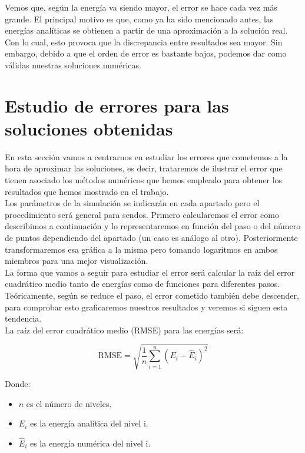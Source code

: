 \documentclass[12pt]{article}
\begin{document}
Vemos que, según la energía va siendo mayor, el error se hace 
cada vez más grande. El principal motivo es que, como ya ha sido 
mencionado antes, las energías analíticas se obtienen a partir 
de una aproximación a la solución real. Con lo cual, esto provoca
que la discrepancia entre resultados sea mayor. Sin embargo,
debido a que el orden de error es bastante bajos, podemos dar
como válidas nuestras soluciones numéricas.
\section{Estudio de errores para las soluciones obtenidas} \label{sec:errores}

En esta sección vamos a centrarnos en estudiar los errores que cometemos a la hora de aproximar las soluciones, es decir, trataremos de ilustrar el error que tienen asociado los métodos numéricos que hemos empleado para obtener los resultados que hemos mostrado en el trabajo.\\

Los parámetros de la simulación se indicarán en cada apartado pero el procedimiento será general para sendos. Primero calcularemos el error como describimos a continuación y lo representaremos en función del paso o del número de puntos dependiendo del apartado (un caso es análogo al otro). Posteriormente transformaremos esa gráfica a la misma pero tomando logaritmos en ambos miembros para una mejor visualización.\\ 

La forma que vamos a seguir para estudiar el error será calcular la raíz del error cuadrático medio tanto de energías como de funciones para diferentes pasos. Teóricamente, según se reduce el paso, el error cometido también debe descender, para comprobar esto graficaremos nuestros resultados y veremos si siguen esta tendencia. \\

La raíz del error cuadrático medio (RMSE) para las energías será:

\[
\text{RMSE} = \sqrt{\frac{1}{n} \sum_{i=1}^{n} (E_i - \hat{E}_i)^2}
\]

Donde:
\begin{itemize}
    \item \( n \) es el número de niveles.
    \item \( E_i \) es la energía analítica del nivel i.
    \item \( \hat{E}_i \) es la energía numérica del nivel i.
\end{itemize}
\end{document}

